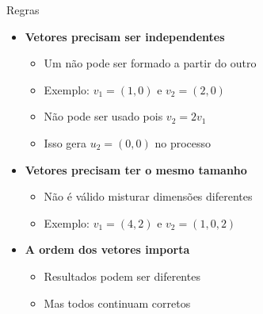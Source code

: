 \documentclass{beamer}
\begin{document}
\begin{frame}{Regras}


\vspace{0.5cm}

\begin{itemize}

\item \textbf{Vetores precisam ser independentes}
\begin{itemize}
    \item Um não pode ser formado a partir do outro
    \item Exemplo: $v_1 = (1,0)$ e $v_2 = (2,0)$
    \item Não pode ser usado pois $v_2 = 2v_1$
    \item Isso gera $u_2 = (0,0)$ no processo
\end{itemize}

\vspace{0.4cm}

\item \textbf{Vetores precisam ter o mesmo tamanho}
\begin{itemize}
    \item Não é válido misturar dimensões diferentes
    \item Exemplo: $v_1 = (4,2)$ e $v_2 = (1,0,2)$
\end{itemize}

\vspace{0.4cm}

\item \textbf{A ordem dos vetores importa}
\begin{itemize}
    \item Resultados podem ser diferentes
    \item Mas todos continuam corretos
\end{itemize}

\end{itemize}

\end{frame}
\end{document}
